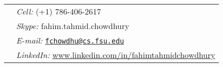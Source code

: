 \documentclass[margin,line]{res}
\begin{document}

\begin{tabular}{@{}p{2.5in}p{4in}}
\hspace{1cm} & {\it Cell:}  (+1) 786-406-2617 \\
\hspace{1cm} & {\it Skype:}    fahim.tahmid.chowdhury\\
\hspace{1cm} & {\it E-mail:} \href{mailto:fchowdhu@cs.fsu.edu}{\nolinkurl{fchowdhu@cs.fsu.edu} } \\
\hspace{1cm} & {\it LinkedIn:} \url{www.linkedin.com/in/fahimtahmidchowdhury} \\
\end{tabular}

\vspace*{-.2in}
\end{document}
